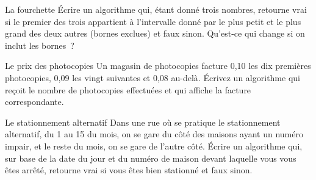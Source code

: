 	\begin{Exercice}{La fourchette}
		Écrire un algorithme qui, étant donné trois nombres, 
		retourne vrai si le premier des trois 
		appartient à l’intervalle donné par le plus petit et le plus grand 
		des deux autres (bornes exclues) et faux sinon. 
		Qu’est-ce qui change si on inclut les bornes~?
	\end{Exercice}

	\begin{Exercice}{Le prix des photocopies}
		Un magasin de photocopies facture 0,10 \texteuro{} 
		les dix premières photocopies, 
		0,09 \texteuro{} les vingt suivantes 
		et 0,08 \texteuro{} au-delà. 
		Écrivez un algorithme 
		qui reçoit le nombre de photocopies effectuées 
		et qui affiche la facture correspondante.
	\end{Exercice}

	\begin{Exercice}{Le stationnement alternatif}
		Dans une rue où se pratique le stationnement alternatif, 
		du 1 au 15 du mois, on se gare du côté des maisons ayant un numéro impair, 
		et le reste du mois, on se gare de l’autre côté. 
		Écrire un algorithme qui, sur base de la date du jour et du numéro de maison
		devant laquelle vous vous êtes arrêté, 
		retourne vrai si vous êtes bien stationné et faux sinon.
	\end{Exercice}

	
